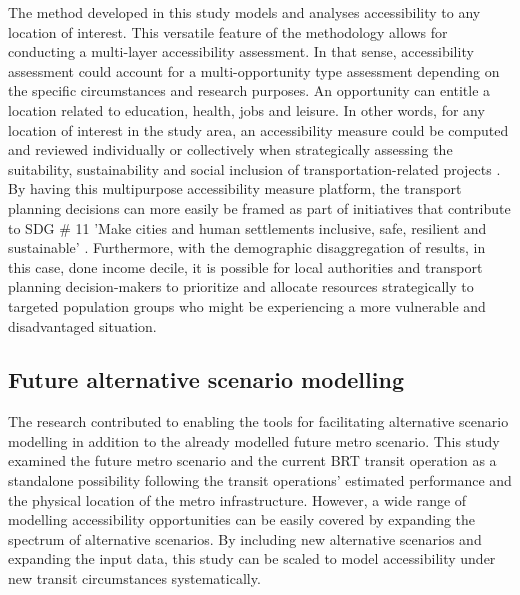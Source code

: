 \documentclass[12pt, a4paper]{report}
\begin{document}
The method developed in this study models and analyses accessibility to any location of interest. This versatile feature of the methodology allows for conducting a multi-layer accessibility assessment. In that sense, accessibility assessment could account for a multi-opportunity type assessment depending on the specific circumstances and research purposes. An opportunity can entitle a location related to education, health, jobs and leisure. In other words, for any location of interest in the study area, an accessibility measure could be computed and reviewed individually or collectively when strategically assessing the suitability, sustainability and social inclusion of transportation-related projects \citep{pereiraIntroductionUrbanAccessibility2023a}. By having this multipurpose accessibility measure platform, the transport planning decisions can more easily be framed as part of initiatives that contribute to SDG \# 11 'Make cities and human settlements inclusive, safe, resilient and sustainable' \citep{unitednations17GOALSSustainable2015}. Furthermore, with the demographic disaggregation of results, in this case, done income decile, it is possible for local authorities and transport planning decision-makers to prioritize and allocate resources strategically to targeted population groups who might be experiencing a  more vulnerable and disadvantaged situation.


\subsection{Future alternative scenario modelling}

The research contributed to enabling the tools for facilitating alternative scenario modelling in addition to the already modelled future metro scenario. This study examined the future metro scenario and the current BRT transit operation as a standalone possibility following the transit operations' estimated performance and the physical location of the metro infrastructure. However, a wide range of modelling accessibility opportunities can be easily covered by expanding the spectrum of alternative scenarios. By including new alternative scenarios and expanding the input data, this study can be scaled to model accessibility under new transit circumstances systematically.
\end{document}

